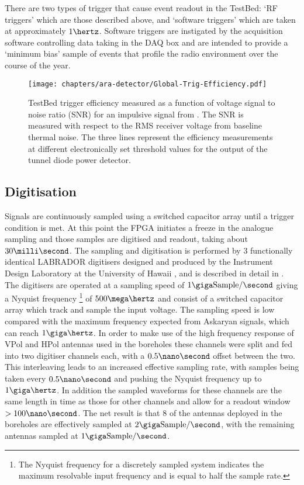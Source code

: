 There are two types of trigger that cause event readout in the TestBed: `RF triggers' which are those described above, and `software triggers' which are taken at approximately $1 \hertz$. Software triggers are instigated by the acquisition software controlling data taking in the DAQ box and are intended to provide a `minimum bias' sample of events that profile the radio environment over the course of the year.

\begin{figure}[htpb]
  \centering
  \texttt{[image: chapters/ara-detector/Global-Trig-Efficiency.pdf]}
  \caption{TestBed trigger efficiency measured as a function of voltage signal to noise ratio (SNR) for an impulsive signal from \cite{Allison2012457}. The SNR is measured with respect to the RMS receiver voltage from baseline thermal noise. The three lines represent the efficiency measurements at different electronically set threshold values for the output of the tunnel diode power detector.}
  \label{fig:ara-detector:TestBed:Trigger-Efficiency}
\end{figure}


\subsection{Digitisation}
\label{sec:ara-detector:TestBed:Digitisation}

Signals are continuously sampled using a switched capacitor array until a trigger condition is met. At this point the FPGA initiates a freeze in the analogue sampling and those samples are digitised and readout, taking about $30 \milli \second$. The sampling and digitisation is performed by 3 functionally identical LABRADOR digitisers designed and produced by the Instrument Design Laboratory at the University of Hawaii \cite{Varner2007447}, and is described in detail in . The digitisers are operated at a sampling speed of $1 \giga \mbox{Sample} /\second$ giving a Nyquist frequency \footnote{The Nyquist frequency for a discretely sampled system indicates the maximum resolvable input frequency and is equal to half the sample rate.} of $500 \mega \hertz$ and consist of a switched capacitor array which track and sample the input voltage. The sampling speed is low compared with the maximum frequency expected from Askaryan signals, which can reach $1 \giga \hertz$. In order to make use of the high frequency response of VPol and HPol antennas used in the boreholes these channels were split and fed into two digitiser channels each, with a $0.5 \nano \second$ offset between the two. This interleaving leads to an increased effective sampling rate, with samples being taken every $0.5 \nano \second$ and pushing the Nyquist frequency up to $1 \giga \hertz$. In addition the sampled waveforms for these channels are the same length in time as those for other channels and allow for a readout window $> 100 \nano \second$. The net result is that 8 of the antennas deployed in the boreholes are effectively sampled at $2 \giga \mbox{Sample} /\second$, with the remaining antennas sampled at $1 \giga \mbox{Sample} /\second$.

